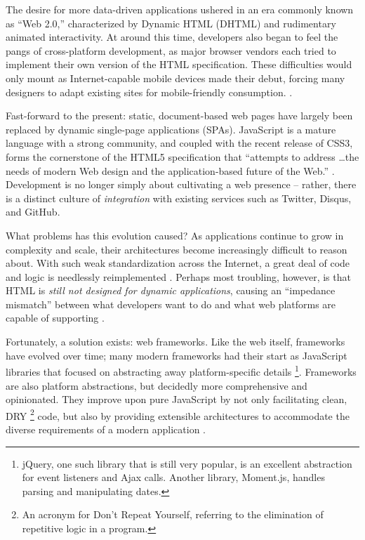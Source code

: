 \documentclass[12pt,letterpaper]{article}
\begin{document}
The desire for more data-driven applications ushered in an era commonly known as ``Web 2.0,'' characterized by Dynamic HTML (DHTML) and rudimentary animated interactivity. At around this time, developers also began to feel the pangs of cross-platform development, as major browser vendors each tried to implement their own version of the HTML specification. These difficulties would only mount as Internet-capable mobile devices made their debut, forcing many designers to adapt existing sites for mobile-friendly consumption. \cite{Schlensker:2014}.

Fast-forward to the present: static, document-based web pages have largely been replaced by dynamic single-page applications (SPAs). JavaScript is a mature language with a strong community, and coupled with the recent release of CSS3, forms the cornerstone of the HTML5 specification that ``attempts to address \ldots the needs of modern Web design and the application-based future of the Web.'' \cite[p.~14]{Sklar:2012}. Development is no longer simply about cultivating a web presence -- rather, there is a distinct culture of \emph{integration} with existing services such as Twitter, Disqus, and GitHub.

What problems has this evolution caused? As applications continue to grow in complexity and scale, their architectures become increasingly difficult to reason about. With such weak standardization across the Internet, a great deal of code and logic is needlessly reimplemented \cite{Schlensker:2014}. Perhaps most troubling, however, is that HTML is \emph{still not designed for dynamic applications}, causing an ``impedance mismatch'' between what developers want to do and what web platforms are capable of supporting \cite{Angular:Docs, Hunt:2014}.

Fortunately, a solution exists: web frameworks. Like the web itself, frameworks have evolved over time; many modern frameworks had their start as JavaScript libraries that focused on abstracting away platform-specific details \footnote{jQuery, one such library that is still very popular, is an excellent abstraction for event listeners and Ajax calls. Another library, Moment.js, handles parsing and manipulating dates.}. Frameworks are also platform abstractions, but decidedly more comprehensive and opinionated. They improve upon pure JavaScript by not only facilitating clean, DRY \footnote{An acronym for Don't Repeat Yourself, referring to the elimination of repetitive logic in a program.} code, but also by providing extensible architectures to accommodate the diverse requirements of a modern application \cite{Schlensker:2014}.
\end{document}
